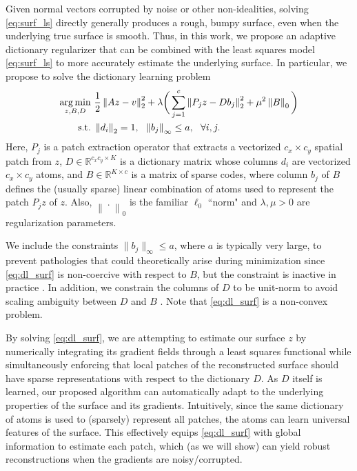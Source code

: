 
Given normal vectors corrupted by noise or other non-idealities, solving \eqref{eq:surf_ls} directly generally produces a rough, bumpy surface, even when the underlying true surface is smooth. Thus, in this work, we propose an adaptive dictionary regularizer that can be combined with the least squares model \eqref{eq:surf_ls} to more accurately estimate the underlying surface. In particular, we propose to solve the dictionary learning problem
\begin{align} \label{eq:dl_surf}
\operatorname*{arg\,min}_{z,B,D} & ~ \frac{1}{2} \left \| A z - v \right \|_2^2 + \lambda \bigg(\sum_{j = 1}^c \left \| P_j z - D b_j \right \|_2^2 + \mu^2 \left \| B \right \|_0 \bigg) \nonumber \\
\text{s.t.} & ~ \left \| d_i \right \|_2 = 1, \ \ \left \| b_j \right \|_{\infty} \leq a, \ \ \forall i,j.
\end{align}
Here, $P_j$ is a patch extraction operator that extracts a vectorized $c_x \times c_y$ spatial patch from $z$, $D \in \mathbb{R}^{c_x c_y \times K}$ is a dictionary matrix whose columns $d_i$ are vectorized $c_x \times c_y$ atoms, and $B \in \mathbb{R}^{K \times c}$ is a matrix of sparse codes, where column $b_j$ of $B$ defines the (usually sparse) linear combination of atoms used to represent the patch $P_j z$ of $z$. Also, $\left \| \ . \ \right \|_0$ is the familiar $\ell_0$ ``norm" and $\lambda, \mu > 0$ are regularization parameters. 

We include the constraints $\|b_j\|_{\infty} \leq a$, where $a$ is typically very large, to prevent pathologies that could theoretically arise during minimization since \eqref{eq:dl_surf} is non-coercive with respect to $B$, but the constraint is inactive in practice \cite{sairajfes2}. In addition, we constrain the columns of $D$ to be unit-norm to avoid scaling ambiguity between $D$ and $B$ \cite{kar}. Note that \eqref{eq:dl_surf} is a non-convex problem.

By solving \eqref{eq:dl_surf}, we are attempting to estimate our surface $z$ by numerically integrating its gradient fields through a least squares functional while simultaneously enforcing that local patches of the reconstructed surface should have sparse representations with respect to the dictionary $D$. As $D$ itself is learned, our proposed algorithm can automatically adapt to the underlying properties of the surface and its gradients. Intuitively, since the same dictionary of atoms is used to (sparsely) represent all patches, the atoms can learn universal features of the surface. This effectively equips \eqref{eq:dl_surf} with global information to estimate each patch, which (as we will show) can yield robust reconstructions when the gradients are noisy/corrupted.

